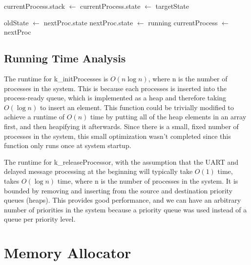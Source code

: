 \documentclass[12pt]{report}
\begin{document}
\begin{algorithm}
    \begin{algorithmic}[1]

            \State currentProcess.stack $\gets$ 
            \State currentProcess.state $\gets$ targetState
                \State {}
            \EndIf
        \EndIf

        \State oldState $\gets$ nextProc.state
        \State nextProc.state $\gets$ running
        \State currentProcess $\gets$ nextProc
        \State {}
            \State {} 
        \EndIf
    \EndFunction
    \end{algorithmic}
\end{algorithm}

\section{Running Time Analysis}

    The runtime for k\_initProcesses is $O(n\log n)$, where n is the number of
    processes in the system. This is because each processes is inserted into the
    process-ready queue, which is implemented as a heap and therefore taking
    $O(\log n)$ to insert an element. This function could be trivially modified
    to achieve a runtime of $O(n)$ time by putting all of the heap elements in
    an array first, and then heapifying it afterwards. Since there is a
    small, fixed number of processes in the system, this small optimization
    wasn't completed since this function only runs once at system startup.

    The runtime for k\_releaseProcessor, with the assumption that the UART and
    delayed message processing at the beginning will typically take $O(1)$ time,
    takes $O(\log n)$ time, where n is the number of processes in the system. It
    is bounded by removing and inserting from the source and destination
    priority queues (heaps). This provides good performance, and we can have an
    arbitrary number of priorities in the system because a priority queue was
    used instead of a queue per priority level.

\chapter{Memory Allocator}
\end{document}
